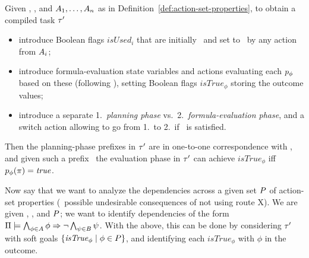 Given \task, \plans, and $A_1, \dots, A_n$ as in
Definition~\ref{def:action-set-properties}, to obtain a compiled task
$\tau'$
\begin{itemize}
\item introduce Boolean flags $\mathit{isUsed}_i$ that are initially
  \false\ and set to \true\ by any action from $A_i$;
\item introduce formula-evaluation state variables and actions
  evaluating each $p_\phi$ based on these (following
  \cite{gazen:knoblock:ecp-97,nebel:jair-00}), setting Boolean flags
  $\mathit{isTrue}_\phi$ storing the outcome values;
\item introduce a separate 1.\ \emph{planning phase}
  vs.\ 2.\ \emph{formula-evaluation phase}, and a switch action
  allowing to go from 1.\ to 2.\ if \goalhard\ is satisfied.
%
%
\end{itemize}
Then the planning-phase prefixes in $\tau'$ are in one-to-one
correspondence with \plans, and given such a prefix \plan\ the
evaluation phase in $\tau'$ can achieve $\mathit{isTrue}_\phi$ iff
$p_\phi(\pi) = \mathit{true}$.

Now say that we want to analyze the dependencies across a given set
$P$ of action-set properties (\eg\ possible undesirable
consequences of not using route X). We are given \task, \plans, and
$P$; we want to identify dependencies of the form
$\Pi \models \bigwedge_{\phi \in A} \phi \Rightarrow \neg \bigwedge_{\psi
    \in B} \psi$. With the above, this can be done by considering
$\tau'$ with soft goals $\{\mathit{isTrue}_\phi \mid \phi \in
P\}$, and identifying each $\mathit{isTrue}_\phi$ with $\phi$ in
the outcome.

